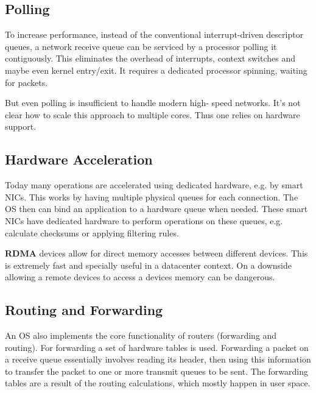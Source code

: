 \subsection{Polling}

To increase performance, instead of the conventional interrupt-driven descriptor queues, a network receive queue can be serviced by a processor polling it contiguously. This eliminates the overhead of interrupts, context switches and maybe even kernel entry/exit. It requires a dedicated processor spinning, waiting for packets. \medskip

But even polling is insufficient to handle modern high- speed networks. It’s not clear how to scale this approach to multiple cores. Thus one relies on hardware support.


\subsection{Hardware Acceleration}

Today many operations are accelerated using dedicated hardware, e.g. by smart NICs. This works by having multiple physical queues for each connection. The OS then can bind an application to a hardware queue when needed. These smart NICs have dedicated hardware to perform operations on these queues, e.g. calculate checksums or applying filtering rules. \medskip

\textbf{RDMA} devices allow for direct memory accesses between different devices. This is extremely fast and specially useful in a datacenter context. On a downside allowing a remote devices to access a devices memory can be dangerous.


\subsection{Routing and Forwarding}

An OS also implements the core functionality of routers (forwarding and routing). For forwarding a set of hardware tables is used. Forwarding a packet on a receive queue essentially involves reading its header, then using this information to transfer the packet to one or more transmit queues to be sent. The forwarding tables are a result of the routing calculations, which mostly happen in user space.

